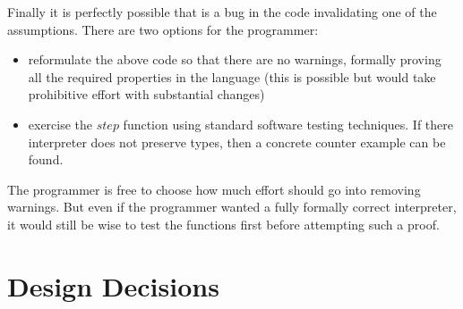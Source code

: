 Finally it is perfectly possible that is a bug in the code invalidating one of the assumptions.
There are two options for the programmer:
\begin{itemize}
\item reformulate the above code so that there are no warnings, formally proving all the required properties in the language (this is possible but would take prohibitive effort with substantial changes)
\item exercise the $step$ function using standard software testing techniques.
If there interpreter does not preserve types, then a concrete counter example can be found.
\end{itemize}
The programmer is free to choose how much effort should go into removing warnings.
But even if the programmer wanted a fully formally correct interpreter, it would still be wise to test the functions first before attempting such a proof.



\section{Design Decisions}

